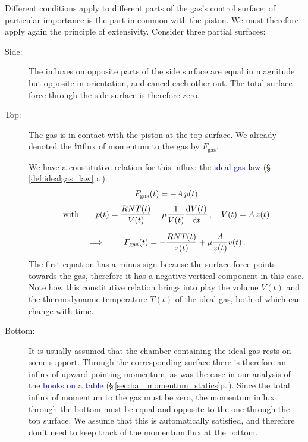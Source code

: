 \documentclass[a4paper,12pt,%
onecolumn,oneside,%
british%
]{memoir}
\newcommand*{\di}{\mathrm{d}}%
\renewcommand*{\|}[1][]{\nonscript\:#1\vert\nonscript\:\mathopen{}}
\newcommand*{\sect}{\S}%
\renewcommand*{\autoref}[3][\sect\,\ref]{\textcolor{blue}{#3} {\color{blue}\scriptsize(\faIcon[regular]{eye}\;#1{#2}\;p.\,\pageref{#2})}}
\newcommand*{\yvis}{\mu} %
\newcommand*{\dt}{\di t}
\newcommand*{\yN}{N}
\newcommand*{\yFgas}{F_{\textrm{gas}}}
\newcommand*{\ypr}{p} %
\newcommand*{\yT}{T}%
\begin{document}
Different conditions apply to different parts of the gas's control surface; of particular importance is the part in common with the piston. We must therefore apply again the principle of extensivity. Consider three partial surfaces:
\begin{description}
\item[Side:] The influxes on opposite parts of the side surface are equal in magnitude but opposite in orientation, and cancel each other out. The total surface force through the side surface is therefore zero.

\item[Top:] The gas is in contact with the piston at the top surface. We already denoted the \textbf{in}flux of momentum to the gas by $\yFgas$.%

  We have a constitutive relation for this influx: the \autoref{def:idealgas_law}{ideal-gas law}:
  \begin{equation*}
    \begin{gathered}
      \yFgas(t) = -A\,\ypr(t)
      \\[\jot]\text{with}\qquad
      \ypr(t) = \frac{R \yN \yT(t)}{V(t)}  - \yvis \frac{1}{V(t)}\frac{\di V(t)}{\dt}
      \,,\quad
      V(t) = A\,z(t)
      \\[2\jot]
      \implies\qquad
      \yFgas(t) = -\frac{R \yN \yT(t)}{z(t)}  + \yvis \frac{A}{z(t)} v(t) \,.
    \end{gathered}
  \end{equation*}
  The first equation has a minus sign because the surface force points towards the gas, therefore it has a negative vertical component in this case. Note how this constitutive relation brings into play the volume $V(t)$ and the thermodynamic temperature $\yT(t)$ of the ideal gas, both of which can change with time.

\item[Bottom:] It is usually assumed that the chamber containing the ideal gas rests on some support. Through the corresponding surface there is therefore an influx of upward-pointing momentum, as was the case in our analysis of the \autoref{sec:bal_momentum_statics}{books on a table}. Since the total influx of momentum to the gas must be zero, the momentum influx through the bottom must be equal and opposite to the one through the top surface. We assume that this is automatically satisfied, and therefore don't need to keep track of the momentum flux at the bottom.
\end{description}
\end{document}
